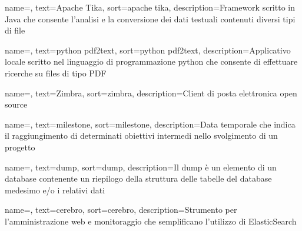 {
	name=,
	text=Apache Tika,
	sort=apache tika,
	description={\gls{Framework} scritto in \gls{Java} che consente l'analisi e la conversione dei dati testuali contenuti diversi tipi di file}
}

{
	name=,
	text=python pdf2text,
	sort=python pdf2text,
	description={Applicativo locale scritto nel linguaggio di programmazione python che consente di effettuare ricerche su files di tipo PDF}
}

{
	name=,
	text=Zimbra,
	sort=zimbra,
	description={Client di posta elettronica \gls{open source}}
}

{
	name=,
	text=milestone,
	sort=milestone,
	description={Data temporale che indica il raggiungimento di determinati obiettivi intermedi nello svolgimento di un progetto}
}

{
	name=,
	text=dump,
	sort=dump,
	description={Il dump è un elemento di un database contenente un riepilogo della struttura delle tabelle del database medesimo e/o i relativi dati}
}

{
	name=,
	text=cerebro,
	sort=cerebro,
	description={Strumento per l'amministrazione web e monitoraggio che semplificano l'utilizzo di \gls{ElasticSearch}}
}